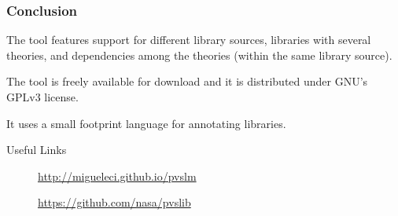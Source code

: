 \documentclass[mathserif,fleqn]{beamer}
\begin{document}
\begin{frame}
  \frametitle{Conclusion}

  \begin{outeritemize}
  \item The  tool features support for different library
    sources, libraries with several theories, and dependencies among
    the theories (within the same library source).

  \item The tool is freely available for download and it is
    distributed under GNU's GPLv3 license.

  \item It uses a small footprint language for annotating libraries.
  \end{outeritemize}
\end{frame}

\begin{frame}{Useful Links}
  \begin{description}
  \item[] \url{http://migueleci.github.io/pvslm}
  \item[]
  \item[] \url{https://github.com/nasa/pvslib}
  \end{description}
\end{frame}
\begin{frame}

  \begin{center}
      {\LARGE {}}
  \end{center}
\end{frame}
\end{document}
